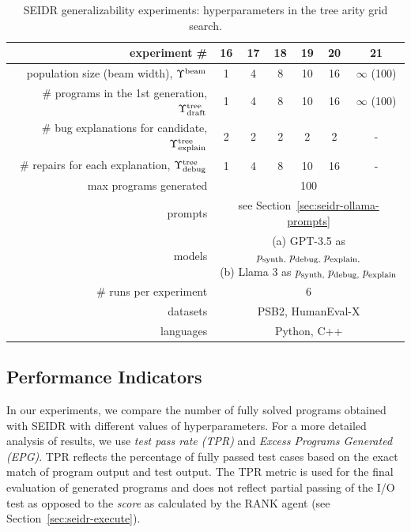 \begin{table}[t]
\setlength{\tabcolsep}{10pt}
\centering
\caption{SEIDR generalizability experiments: hyperparameters in the tree arity grid search.}\small
\label{tab:w-n-generalizability}
\begin{tabular}{rcccccc}
\toprule
experiment \# & 16 & 17 & 18 & 19 & 20 & 21\\
\midrule
population size (beam width), $\Upsilon^\text{beam}{}$ & 1 & 4 & 8 & 10 & 16 & $\infty$ (100) \\[4pt]
\# programs in the 1st generation, $\Upsilon^\text{tree}_\text{draft}$ & 1 & 4 & 8 & 10 & 16 & $\infty$ (100) \\[4pt]
\# bug explanations for candidate, $\Upsilon^\text{tree}_\text{explain}$ & 2 & 2 & 2 & 2 & 2 & - \\[4pt]
\# repairs for each explanation, $\Upsilon^\text{tree}_\text{debug}$ & 1 & 4 & 8 & 10 & 16 & - \\[4pt]
\midrule
max programs generated & \multicolumn{6}{c}{100} \\[4pt]
prompts & \multicolumn{6}{c}{see Section~\ref{sec:seidr-ollama-prompts}} \\[4pt]
models  & \multicolumn{6}{c}{
 \parbox{5cm}{
     (a) GPT-3.5 as $p_\text{synth,} \; p_\text{debug,} \; p_\text{explain,}$ \\
     (b) Llama 3 as $p_\text{synth,} \; p_\text{debug,} \; p_\text{explain}$
     }
} \\[10pt]
\midrule
\# runs per experiment &  \multicolumn{6}{c}{6} \\[4pt]
datasets  & \multicolumn{6}{c}{PSB2, HumanEval-X} \\[4pt] 
languages  & \multicolumn{6}{c}{Python, C++} \\[4pt]
\bottomrule
\end{tabular}
\end{table}

\subsection{Performance Indicators}
\label{sec:seidr-metrics}

\sloppy %
In our experiments, we compare 
the number of fully solved programs obtained with SEIDR with different values of hyperparameters. 
For a more detailed analysis of results, we use \emph{test pass rate (TPR)} and \emph{Excess Programs Generated (EPG)}.
TPR reflects the percentage of fully passed test cases based on the exact match of program output and test output. 
The TPR metric is used for the final evaluation of generated programs and does not reflect partial passing of the I/O test as opposed to the \emph{score} as calculated by the RANK agent (see Section~\ref{sec:seidr-execute}). 

